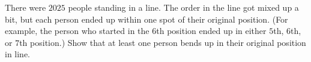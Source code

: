 There were $2025$ people standing in a line. The order in the line got mixed up a bit, but each person ended up within one spot of their original position. (For example, the person who started in the $6$th position ended up in either $5$th, $6$th, or $7$th position.) Show that at least one person bends up in their original position in line.
